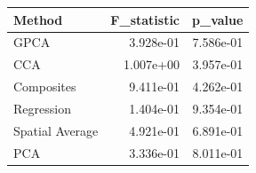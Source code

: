 \begin{tabular}{lrr}
\toprule
Method & F_statistic & p_value \\
\midrule
GPCA & 3.928e-01 & 7.586e-01 \\
CCA & 1.007e+00 & 3.957e-01 \\
Composites & 9.411e-01 & 4.262e-01 \\
Regression & 1.404e-01 & 9.354e-01 \\
Spatial Average & 4.921e-01 & 6.891e-01 \\
PCA & 3.336e-01 & 8.011e-01 \\
\bottomrule
\end{tabular}
